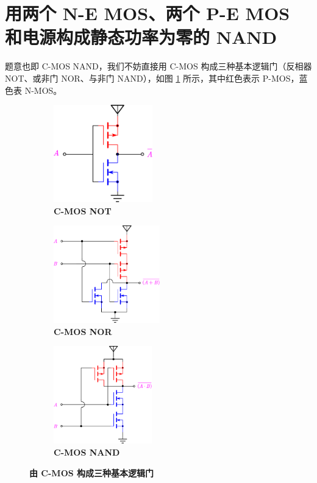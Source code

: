 \documentclass[UTF8]{report}
\theoremstyle{MyLineTheoremStyle} %
\theoremstyle{MyBlockTheoremStyle} %
\theoremstyle{MySubsubsectionStyle} %
\begin{document}
\section{用两个 N-E MOS、两个 P-E MOS 和电源构成静态功率为零的 NAND}

题意也即 C-MOS NAND，我们不妨直接用 C-MOS 构成三种基本逻辑门（反相器 NOT、或非门 NOR、与非门 NAND），如图 \ref{由 C-MOS 构成三种基本逻辑门} 所示，其中红色表示 P-MOS，蓝色表 N-MOS。

\begin{figure}[H]\centering
    \begin{subfigure}[t]{0.33\columnwidth}\centering
        \includegraphics[height=120pt]{assets/5/CMOS NOT.pdf}
        \caption{\bfseries C-MOS NOT }
    \end{subfigure}\hfill
    \begin{subfigure}[t]{0.33\columnwidth}\centering
        \includegraphics[height=120pt]{assets/5/CMOS NOR.pdf}
        \caption{\bfseries C-MOS NOR }
    \end{subfigure}
    \begin{subfigure}[t]{0.33\columnwidth}\centering
        \includegraphics[height=120pt]{assets/5/CMOS NAND.pdf}
        \caption{\bfseries C-MOS NAND }
    \end{subfigure}
    \caption{\bfseries 由 C-MOS 构成三种基本逻辑门 }\label{由 C-MOS 构成三种基本逻辑门}
\end{figure}
\end{document}
